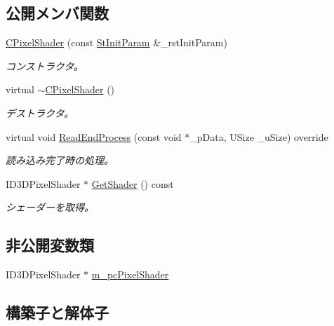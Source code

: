 \subsection*{公開メンバ関数}
\begin{DoxyCompactItemize}
\item 
\hyperlink{class_c_pixel_shader_af98a997f879b9fc4f08affc2d1818bd1}{C\+Pixel\+Shader} (const \hyperlink{struct_c_pixel_shader_1_1_st_init_param}{St\+Init\+Param} \&\+\_\+rst\+Init\+Param)
\begin{DoxyCompactList}\small\item\em コンストラクタ。 \end{DoxyCompactList}\item 
virtual \hyperlink{class_c_pixel_shader_aad0c95b78a92ee366175157e09f6baea}{$\sim$\+C\+Pixel\+Shader} ()
\begin{DoxyCompactList}\small\item\em デストラクタ。 \end{DoxyCompactList}\item 
virtual void \hyperlink{class_c_pixel_shader_a5a70cfcd3b998c6f55f4c95f351e940e}{Read\+End\+Process} (const void $\ast$\+\_\+p\+Data, U\+Size \+\_\+u\+Size) override
\begin{DoxyCompactList}\small\item\em 読み込み完了時の処理。 \end{DoxyCompactList}\item 
I\+D3\+D\+Pixel\+Shader $\ast$ \hyperlink{class_c_pixel_shader_ad13d85569d067e80b15ddee8fd10e2a9}{Get\+Shader} () const 
\begin{DoxyCompactList}\small\item\em シェーダーを取得。 \end{DoxyCompactList}\end{DoxyCompactItemize}
\subsection*{非公開変数類}
\begin{DoxyCompactItemize}
\item 
I\+D3\+D\+Pixel\+Shader $\ast$ \hyperlink{class_c_pixel_shader_abd3ec734645bdd2d8828d30fad71ee4f}{m\+\_\+pc\+Pixel\+Shader}
\end{DoxyCompactItemize}


\subsection{構築子と解体子}
\hypertarget{class_c_pixel_shader_af98a997f879b9fc4f08affc2d1818bd1}{}
